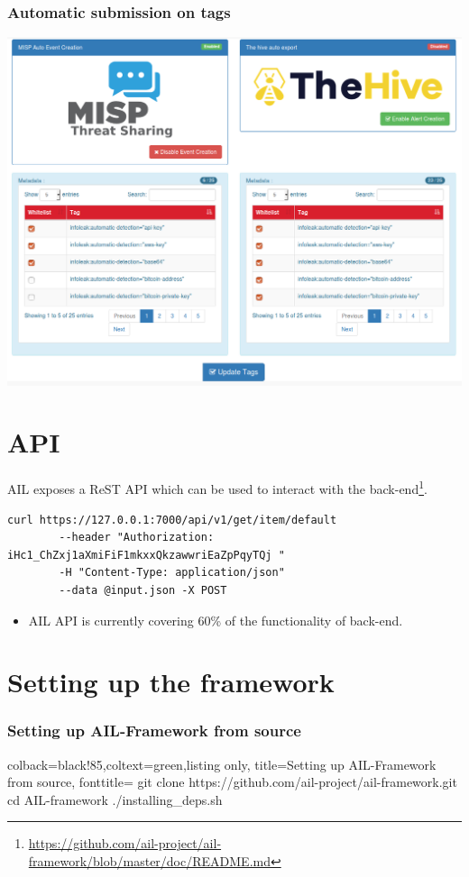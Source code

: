 \documentclass{beamer}
\begin{document}
\begin{frame}
    \frametitle{Automatic submission on tags}
    \centerline{\includegraphics[scale=0.25]{screenshot/tag_auto_export.png}}
\end{frame}


\section{API}

\begin{frame}[fragile]
AIL exposes a ReST API which can be used to interact with the back-end\footnote{\url{https://github.com/ail-project/ail-framework/blob/master/doc/README.md}}.

        \begin{lstlisting}
curl https://127.0.0.1:7000/api/v1/get/item/default
        --header "Authorization: iHc1_ChZxj1aXmiFiF1mkxxQkzawwriEaZpPqyTQj "
        -H "Content-Type: application/json"
        --data @input.json -X POST
        \end{lstlisting}
        \begin{itemize}
                \item AIL API is currently covering 60\% of the functionality of back-end.
        \end{itemize}
\end{frame}

\section{Setting up the framework}
\lstset{style=bash}
\begin{frame}[fragile]
    \frametitle{Setting up AIL-Framework from source}
    \begin{tcblisting}{colback=black!85,coltext=green,listing only,
        title=Setting up AIL-Framework from source, fonttitle=\bfseries}
git clone https://github.com/ail-project/ail-framework.git
cd AIL-framework
./installing_deps.sh
\end{tcblisting}
\end{frame}
\end{document}

